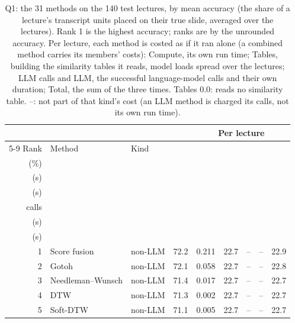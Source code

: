\begin{table}[t]
\centering
\setlength{\tabcolsep}{3pt}
\caption{Q1: the 31 methods on the 140 test lectures, by mean accuracy (the share of a lecture's transcript units placed on their true slide, averaged over the lectures). Rank 1 is the highest accuracy; ranks are by the unrounded accuracy. Per lecture, each method is costed as if it ran alone (a combined method carries its members' costs): Compute, its own run time; Tables, building the similarity tables it reads, model loads spread over the lectures; LLM calls and LLM, the successful language-model calls and their own duration; Total, the sum of the three times. Tables 0.0: reads no similarity table. --: not part of that kind's cost (an LLM method is charged its calls, not its own run time).}
\label{tab:q1}
\begin{tabular*}{\linewidth}{@{\extracolsep{\fill}}rllrrrrrr@{}}
\toprule
 & & & & \multicolumn{5}{c}{Per lecture} \\
\cmidrule(lr){5-9}
Rank & Method & Kind & \begin{tabular}[b]{@{}r@{}}Accuracy\\(\%)\end{tabular} & \begin{tabular}[b]{@{}r@{}}Compute\\(s)\end{tabular} & \begin{tabular}[b]{@{}r@{}}Tables\\(s)\end{tabular} & \begin{tabular}[b]{@{}r@{}}LLM\\calls\end{tabular} & \begin{tabular}[b]{@{}r@{}}LLM\\(s)\end{tabular} & \begin{tabular}[b]{@{}r@{}}Total\\(s)\end{tabular} \\
\midrule
1 & Score fusion & non-LLM & 72.2 & 0.211 & 22.7 & -- & -- & 22.9 \\
2 & Gotoh & non-LLM & 72.1 & 0.058 & 22.7 & -- & -- & 22.8 \\
3 & Needleman--Wunsch & non-LLM & 71.4 & 0.017 & 22.7 & -- & -- & 22.7 \\
4 & DTW & non-LLM & 71.3 & 0.002 & 22.7 & -- & -- & 22.7 \\
5 & Soft-DTW & non-LLM & 71.1 & 0.005 & 22.7 & -- & -- & 22.7 \\

\end{tabular*}
\end{table}
